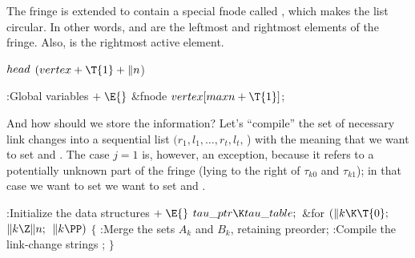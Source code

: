 The fringe is extended to contain a special fnode called ,
which makes the list circular. In other words,  and %
are the leftmost and rightmost elements of the fringe. Also,
 is the rightmost active element.

\Y\B\4\D$\\{head}$ \5
$(\\{vertex}+\T{1}+\|n{}$)\par
\Y\B\4:Global variables\X${}\mathrel+\E{}$\6
\&{fnode} ${}\\{vertex}[\\{maxn}+\T{1}]{}$;\par
\fi

And how should we store the  information? Let's ``compile''
the
set of necessary link changes into a sequential list $(r_1,l_1,
\ldots, r_t, l_t,\,$\PB{$\NULL$}) with the meaning that
we want to set 
and .
The case $j=1$ is, however, an exception, because it refers to a
potentially unknown part of the fringe (lying to the right of
$\tau_{k0}$ and $\tau_{k1}$); in that case we want to set
we want to set 
and .

\Y\B\4:Initialize the data structures\X${}\mathrel+\E{}$\6
$\\{tau\_ptr}\K\\{tau\_table};{}$\6
\&{for} ${}(\|k\K\T{0};{}$ ${}\|k\Z\|n;{}$ ${}\|k\PP){}$\5
${}\{{}$\1\6
:Merge the sets $A_k$ and $B_k$, retaining preorder\X;\6
:Compile the link-change strings \X;\6
\4${}\}{}$\2\par
\fi

